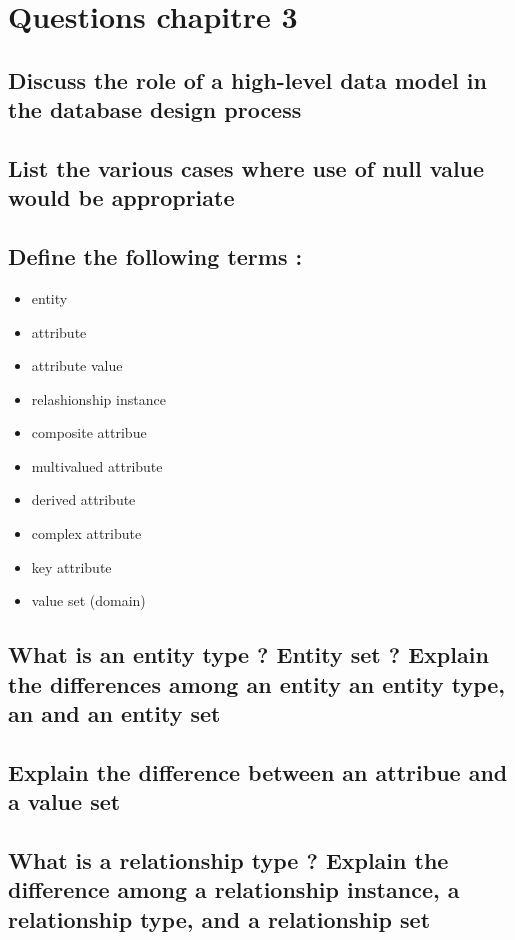 \section{Questions chapitre 3}

\subsection{Discuss the role of a high-level data model in the database design process}

\subsection{List the various cases where use of null value would be appropriate}

\subsection{Define the following terms :}

\begin{itemize}
	\item entity
	\item attribute
	\item attribute value
	\item relashionship instance
	\item composite attribue
	\item multivalued attribute
	\item derived attribute
	\item complex attribute
	\item key attribute
	\item value set (domain)
\end{itemize}

\subsection{What is an entity type ? Entity set ? Explain the differences among an entity an entity type, an and an entity set}

\subsection{Explain the difference between an attribue and a value set}

\subsection{What is a relationship type ? Explain the difference among a relationship instance, a relationship type, and a relationship set}

